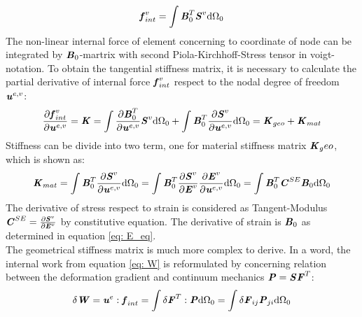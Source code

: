 \begin{equation}
\textbf{\textit{f}}_{int}^v = \int \textbf{\textit{B}}_0^T \textbf{\textit{S}}^v \mathrm{d}\Omega_0
\end{equation}
The non-linear internal force of element concerning to coordinate of node can be integrated by $\textbf{\textit{B}}_0$-martrix with second Piola-Kirchhoff-Stress tensor in voigt-notation. To obtain the tangential stiffness matrix, it is necessary to calculate the partial derivative of internal force $\textbf{\textit{f}}_{int}^v$ respect to the nodal degree of freedom $\textbf{\textit{u}}^{e,v}$:
\begin{equation} \label{K}
\frac{\partial \textbf{\textit{f}}_{int}^v}{\partial \textbf{\textit{u}}^{e,v}} = \textbf{\textit{K}} = \int \frac{\partial \textbf{\textit{B}}_0^T}{\partial \textbf{\textit{u}}^{e,v}} \textbf{\textit{S}}^v \mathrm{d}\Omega_0 + \int \textbf{\textit{B}}_0^T \frac{\partial \textbf{\textit{S}}^v}{\partial \textbf{\textit{u}}^{e,v}} \mathrm{d}\Omega_0 = \textbf{\textit{K}}_{geo} + \textbf{\textit{K}}_{mat}
\end{equation}
Stiffness can be divide into two term, one for material stiffness matrix $\textbf{\textit{K}}_geo$, which is shown as:
\begin{equation}
\textbf{\textit{K}}_{mat} = \int \textbf{\textit{B}}_0^T \frac{\partial \textbf{\textit{S}}^v}{\partial \textbf{\textit{u}}^{e,v}}\mathrm{d}\Omega_0 = \int \textbf{\textit{B}}_0^T\frac{\partial \textbf{\textit{S}}^v}{\partial \textbf{\textit{E}}^v} \frac{\partial \textbf{\textit{E}}^v}{\partial \textbf{\textit{u}}^{e,v}} \mathrm{d}\Omega_0 = \int \textbf{\textit{B}}_0^T \textbf{\textit{C}}^{SE} \textbf{\textit{B}}_0 \mathrm{d}\Omega_0
\end{equation}
The derivative of stress respect to strain is considered as Tangent-Modulus $\textbf{\textit{C}}^{SE} = \frac{\partial \textbf{\textit{S}}^v}{\partial \textbf{\textit{E}}^v}$ by constitutive equation. The derivative of strain is $\textbf{\textit{B}}_0$ as determined in equation \ref{eq: E_eq}. \\
The geometrical stiffness matrix is much more complex to derive. In a word, the internal work from equation \ref{eq: W} is reformulated by concerning relation between the deformation gradient and continuum mechanics $\textbf{\textit{P}} = \textbf{\textit{S}}\textbf{\textit{F}}^T$:
\begin{equation}
\delta \textbf{\textit{W}} = \textbf{\textit{u}}^e : \textbf{\textit{f}}_{int} = \int \delta \textbf{\textit{F}}^T : \textbf{\textit{P}} \mathrm{d}\Omega_0 = \int \delta \textbf{\textit{F}}_{ij} \textbf{\textit{P}}_{ji} \mathrm{d}\Omega_0
\end{equation}

